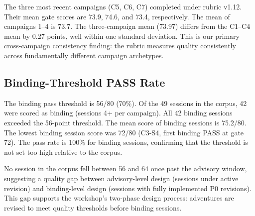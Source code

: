 The three most recent campaigns (C5, C6, C7) completed under rubric v1.12. Their mean
gate scores are 73.9, 74.6, and 73.4, respectively. The mean of campaigns 1--4 is 73.7.
The three-campaign mean (73.97) differs from the C1--C4 mean by 0.27 points, well within
one standard deviation. This is our primary cross-campaign consistency finding: the rubric
measures quality consistently across fundamentally different campaign archetypes.

\subsection{Binding-Threshold PASS Rate}

The binding pass threshold is 56/80 (70\%). Of the 49 sessions in the corpus, 42 were
scored as binding (sessions 4+ per campaign). All 42 binding sessions exceeded the
56-point threshold. The mean score of binding sessions is 75.2/80. The lowest binding
session score was 72/80 (C3-S4, first binding PASS at gate 72). The pass rate is
100\% for binding sessions, confirming that the threshold is not set too high relative
to the corpus.

No session in the corpus fell between 56 and 64 once past the advisory window,
suggesting a quality gap between advisory-level design (sessions under active revision)
and binding-level design (sessions with fully implemented P0 revisions). This gap
supports the workshop's two-phase design process: adventures are revised to meet quality
thresholds before binding sessions.
